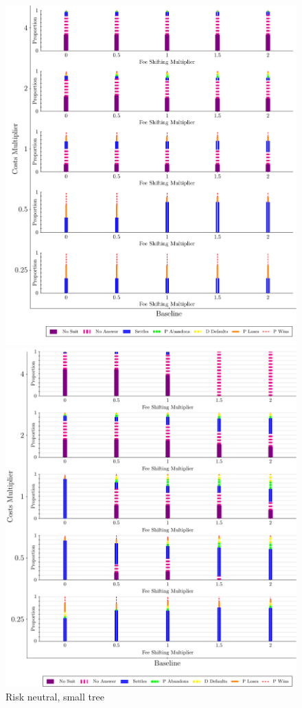 \documentclass{article}
\begin{document}
\begin{figure}
\begin{minipage}{0.24\textwidth}
		\includegraphics[scale=0.15, trim={0in 0in 0in 0in}, clip]{../Figures/Disposition Baseline (Small Tree).pdf}
		\caption{Risk neutral, small tree}
		\label{fig:treesize_panel2}
    \end{minipage}
   \begin{minipage}{0.24\textwidth}
        \centering
        \includegraphics[scale=0.15, trim={0in 0in 0in 0in}, clip]{../Figures/Disposition (Risk Averse) Baseline.pdf}

\end{minipage}
\end{figure}
\end{document}
